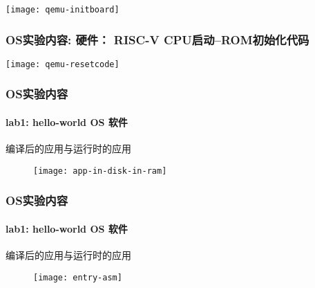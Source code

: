 \begin{frame}[plain]
    \centering
    \texttt{[image: qemu-initboard]}
\end{frame}


\begin{frame}[plain]
    \frametitle{OS实验内容: 硬件： RISC-V CPU启动--ROM初始化代码}
    
    \centering
    \texttt{[image: qemu-resetcode]}
\end{frame}


\begin{frame}
    \frametitle{OS实验内容}
    \framesubtitle{lab1: hello-world OS  软件}
    
    编译后的应用与运行时的应用
    \begin{figure}
        \centering
        \texttt{[image: app-in-disk-in-ram]} %
    \end{figure}
\end{frame}

\begin{frame}
    \frametitle{OS实验内容}
    \framesubtitle{lab1: hello-world OS  软件}
    
    编译后的应用与运行时的应用
    \begin{figure}
        \centering
        \texttt{[image: entry-asm]} %
    \end{figure}
\end{frame}

